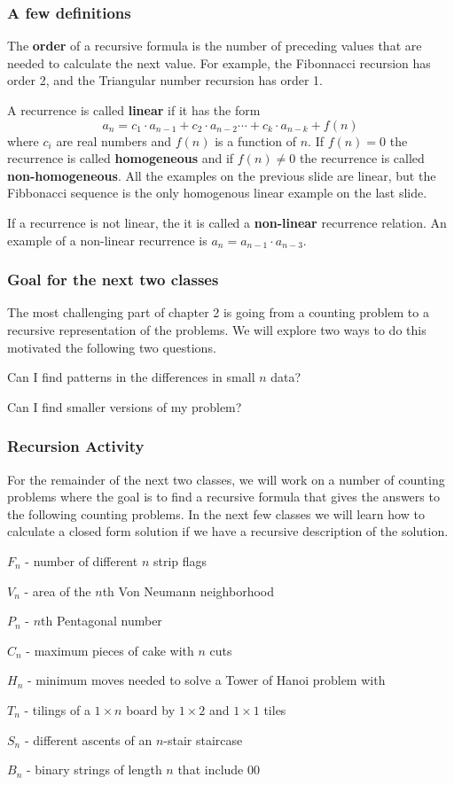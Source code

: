 \documentclass{beamer}
\newenvironment{packed_enum}{
\begin{enumerate}
  \setlength{\itemsep}{1pt}
  \setlength{\parskip}{0pt}
  \setlength{\parsep}{0pt}
}{\end{enumerate}}
\begin{document}
\frame
{
  \frametitle{A few definitions}

The {\bf order} of a recursive formula is the number of preceding values that are needed to calculate the next value.  For example, the Fibonnacci recursion has order 2, and the Triangular number recursion has order 1.\vfill

A recurrence is called {\bf linear} if it has the form $$a_n=c_1\cdot a_{n-1}+c_2\cdot a_{n-2} \cdots + c_k\cdot a_{n-k} +f(n)$$ where $c_i$ are real numbers and $f(n)$ is a function of $n$.  If $f(n)=0$ the recurrence is called {\bf homogeneous} and if $f(n) \ne0$ the recurrence is called {\bf non-homogeneous}. All the examples on the previous slide are linear, but the Fibbonacci sequence is the only homogenous linear example on the last slide.\vfill

If a recurrence is not linear, the it is called a {\bf non-linear} recurrence relation. An example of a non-linear recurrence is $a_n=a_{n-1}\cdot a_{n-3}$.\vfill


}


\frame
{
  \frametitle{Goal for the next two classes}

The most challenging part of chapter 2 is going from a counting problem to a recursive representation of the problems.  We will explore two ways to do this motivated the following two questions.\vfill


\begin{packed_enum}
\item Can I find patterns in the differences in small $n$ data?
\item Can I find smaller versions of my problem?
\end{packed_enum}


}

\frame
{
  \frametitle{Recursion Activity}

For the remainder of the next  two classes, we will work on a number of counting problems where the goal is to find a recursive formula that gives the answers to the following counting problems.  In the next few classes we will learn how to calculate a closed form solution if we have a recursive description of the solution.
\vfill

\begin{packed_enum}
\item $F_n$ - number of different $n$ strip flags
\item $V_n$ - area of the $n$th Von Neumann neighborhood
\item $P_n$ -  $n$th Pentagonal number
\item $C_n$ - maximum pieces of cake with $n$ cuts
\item $H_n$ - minimum moves needed to solve a Tower of Hanoi problem with 
\item $T_n$ - tilings of a $1\times n$ board by $1 \times 2$ and $1 \times 1$ tiles
\item $S_n$ - different ascents of an $n$-stair staircase
\item $B_n$ - binary strings of length $n$ that include 00
\end{packed_enum}

}
\end{document}
